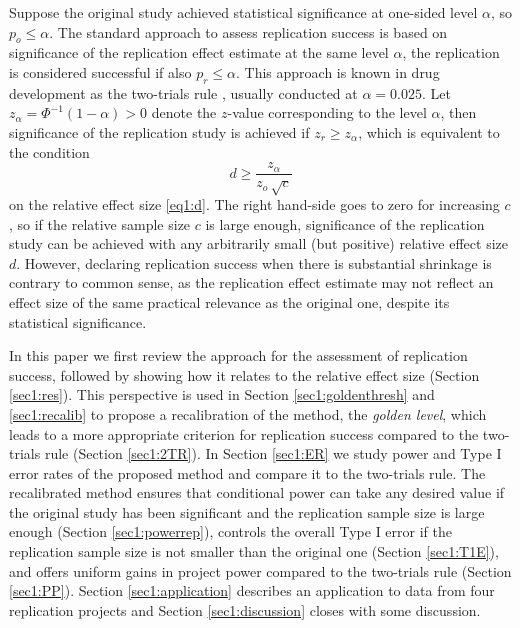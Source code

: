 Suppose the original study achieved statistical significance at one-sided level
$\alpha$, so $p_o \leq \alpha$. The standard approach to assess replication
success is based on significance of the replication effect estimate at the same
level $\alpha$, \ie{} the replication is considered successful if also
$p_r \leq \alpha$. This approach is known in drug development as the two-trials
rule \citep{Senn2008}, usually conducted at $\alpha=0.025$. Let
$z_\alpha = \Phi^{-1}(1-{\alpha})>0$ denote the $z$-value corresponding to the
level $\alpha$, then significance of the replication study is achieved if
$z_r \geq z_\alpha$, which is equivalent to the condition
\begin{equation}\label{eq1:dSig}
   d \geq \frac{z_\alpha}{z_o  \, \sqrt{c}}
\end{equation}
on the relative effect size \eqref{eq1:d}. The right hand-side goes to zero for
increasing $c$, so if the relative sample size $c$ is large enough, significance
of the replication study can be achieved with any arbitrarily small (but
positive) relative effect size $d$. However, declaring replication success when
there is substantial shrinkage is contrary to common sense, as the replication
effect estimate may not reflect an effect size of the same practical relevance
as the original one, despite its statistical significance.

In this paper we first review the \citet{Held2020} approach for the assessment
of replication success, followed by showing how it relates to the relative
effect size (Section \ref{sec1:res}). This perspective is used in Section
\ref{sec1:goldenthresh} and \ref{sec1:recalib} to propose a recalibration of the
method, the \textit{golden level}, which leads to a more appropriate criterion
for replication success compared to the two-trials rule (Section \ref{sec1:2TR}).
In Section \ref{sec1:ER} we study power and Type I error rates of the proposed
method and compare it to the two-trials rule. The recalibrated method ensures
that conditional power can take any desired value if the original study has been
significant and the replication sample size is large enough (Section
\ref{sec1:powerrep}), controls the overall Type I error if the replication sample
size is not smaller than the original one (Section \ref{sec1:T1E}), and offers
uniform gains in project power compared to the two-trials rule (Section
\ref{sec1:PP}). Section \ref{sec1:application} describes an application to data
from four replication projects and Section \ref{sec1:discussion} closes with some
discussion.

